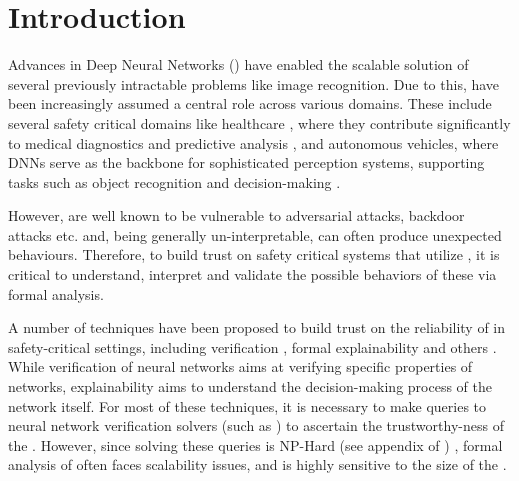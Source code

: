 
\section{Introduction}


Advances in Deep Neural Networks (\dnn) have enabled the scalable solution
of several previously intractable problems like image recognition. Due to this, \dnn have been increasingly assumed a central role
across various domains. These include several safety critical domains like
healthcare \cite{b1}, where they contribute significantly to medical diagnostics
and predictive analysis \cite{b2}, and autonomous vehicles, where DNNs serve as
the backbone for sophisticated perception systems, supporting tasks such as
object recognition and decision-making \cite{b3}. 

However, \dnn are well known to be vulnerable to adversarial attacks, backdoor attacks
\cite{backdoor-poisoning} etc.  and, being generally un-interpretable, can often produce 
unexpected behaviours. Therefore, to build trust on safety critical systems 
that utilize \dnn, it is  critical to understand, interpret 
and validate the possible behaviors of these \dnn via formal analysis.

A number of techniques have been proposed to build trust on the reliability
of \dnn in safety-critical settings, including verification \cite{reluplex,
deeppoly} , formal explainability \cite{overview-fxai,
minimal-image-fxai} and others . While verification of neural networks 
aims at verifying specific properties of networks, 
explainability aims to understand the decision-making process of the network 
itself. For most of these
techniques, it is necessary to make queries to neural network verification
solvers (such as \cite{reluplex}) to ascertain the trustworthy-ness of the \dnn.
 However, since solving these queries is NP-Hard (see appendix of
\cite{reluplex}) , formal analysis of \dnn
often faces scalability issues, and is highly sensitive to the size of the \dnn.

